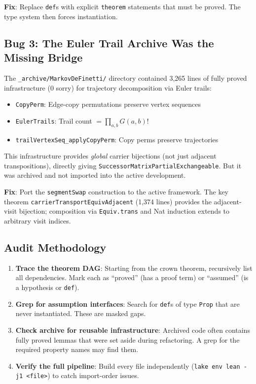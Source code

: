\documentclass[11pt,a4paper]{article}
\theoremstyle{definition}
\begin{document}
\textbf{Fix}: Replace \texttt{def}s with explicit \texttt{theorem} statements
that must be proved. The type system then forces instantiation.

\subsection{Bug 3: The Euler Trail Archive Was the Missing Bridge}

The \texttt{\_archive/MarkovDeFinetti/} directory contained 3,265 lines
of fully proved infrastructure (0 sorry) for trajectory decomposition
via Euler trails:

\begin{itemize}
\item \texttt{CopyPerm}: Edge-copy permutations preserve vertex sequences
\item \texttt{EulerTrails}: Trail count $= \prod_{a,b} G(a,b)!$
\item \texttt{trailVertexSeq\_applyCopyPerm}: Copy perms preserve trajectories
\end{itemize}

This infrastructure provides \emph{global} carrier bijections (not just
adjacent transpositions), directly giving \texttt{SuccessorMatrixPartialExchangeable}.
But it was archived and not imported into the active development.

\textbf{Fix}: Port the \texttt{segmentSwap} construction to the active
framework. The key theorem \texttt{carrierTransportEquivAdjacent} (1,374 lines)
provides the adjacent-visit bijection; composition via \texttt{Equiv.trans}
and Nat induction extends to arbitrary visit indices.

\subsection{Audit Methodology}

\begin{enumerate}
\item \textbf{Trace the theorem DAG}: Starting from the crown theorem,
  recursively list all dependencies. Mark each as ``proved'' (has a
  proof term) or ``assumed'' (is a hypothesis or \texttt{def}).
\item \textbf{Grep for assumption interfaces}: Search for \texttt{def}s
  of type \texttt{Prop} that are never instantiated. These are masked
  gaps.
\item \textbf{Check archive for reusable infrastructure}: Archived code
  often contains fully proved lemmas that were set aside during
  refactoring. A grep for the required property names may find them.
\item \textbf{Verify the full pipeline}: Build every file independently
  (\texttt{lake env lean -j1 <file>}) to catch import-order issues.
\end{enumerate}
\end{document}
